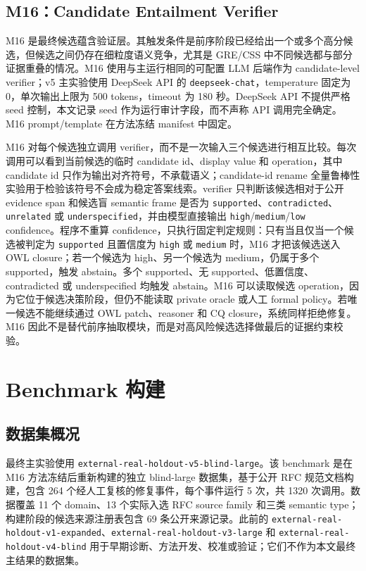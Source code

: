 \documentclass[11pt]{article}
\begin{document}
\subsection{M16：Candidate Entailment Verifier}

M16 是最终候选蕴含验证层。其触发条件是前序阶段已经给出一个或多个高分候选，但候选之间仍存在细粒度语义竞争，尤其是 GRE/CSS 中不同候选都与部分证据重叠的情况。M16 使用与主运行相同的可配置 LLM 后端作为 candidate-level verifier；v5 主实验使用 DeepSeek API 的 \texttt{deepseek-chat}，temperature 固定为 0，单次输出上限为 500 tokens，timeout 为 180 秒。DeepSeek API 不提供严格 seed 控制，本文记录 seed 作为运行审计字段，而不声称 API 调用完全确定。M16 prompt/template 在方法冻结 manifest 中固定。

M16 对每个候选独立调用 verifier，而不是一次输入三个候选进行相互比较。每次调用可以看到当前候选的临时 candidate id、display value 和 operation，其中 candidate id 只作为输出对齐符号，不承载语义；candidate-id rename 全量鲁棒性实验用于检验该符号不会成为稳定答案线索。verifier 只判断该候选相对于公开 evidence span 和候选盲 semantic frame 是否为 \texttt{supported}、\texttt{contradicted}、\texttt{unrelated} 或 \texttt{underspecified}，并由模型直接输出 \texttt{high}/\texttt{medium}/\texttt{low} confidence。程序不重算 confidence，只执行固定判定规则：只有当且仅当一个候选被判定为 \texttt{supported} 且置信度为 \texttt{high} 或 \texttt{medium} 时，M16 才把该候选送入 OWL closure；若一个候选为 high、另一个候选为 medium，仍属于多个 supported，触发 abstain。多个 supported、无 supported、低置信度、contradicted 或 underspecified 均触发 abstain。M16 可以读取候选 operation，因为它位于候选决策阶段，但仍不能读取 private oracle 或人工 formal policy。若唯一候选不能继续通过 OWL patch、reasoner 和 CQ closure，系统同样拒绝修复。M16 因此不是替代前序抽取模块，而是对高风险候选选择做最后的证据约束校验。

\section{Benchmark 构建}

\subsection{数据集概况}

最终主实验使用 \texttt{external-real-holdout-v5-blind-large}。该 benchmark 是在 M16 方法冻结后重新构建的独立 blind-large 数据集，基于公开 RFC 规范文档构建，包含 264 个经人工复核的修复事件，每个事件运行 5 次，共 1320 次调用。数据覆盖 11 个 domain、13 个实际入选 RFC source family 和三类 semantic type；构建阶段的候选来源注册表包含 69 条公开来源记录。此前的 \texttt{external-real-holdout-v1-expanded}、\texttt{external-real-holdout-v3-large} 和 \texttt{external-real-holdout-v4-blind} 用于早期诊断、方法开发、校准或验证；它们不作为本文最终主结果的数据集。
\end{document}
